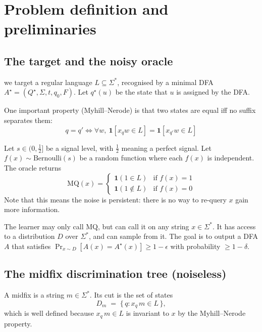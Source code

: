 \section{Problem definition and preliminaries}

\subsection{The target and the noisy oracle}

\begin{definition}[Target]
we target a regular language $L\subseteq\Sigma^*$, recognised by a minimal DFA
$A^\star=(Q^\star,\Sigma,t,q_0,F)$. Let $q^\star(u)$ be the state that $u$
is assigned by the DFA.

One important property (Myhill--Nerode) is that two states are equal iff no suffix separates them:
$$q=q'\iff \forall w,\ \mathbf 1[x_q w\in L]=\mathbf 1[x_{q'} w\in L]$$
\end{definition}

\begin{definition}
Let $s \in (0, \tfrac12]$ be a signal level, with $\frac 12$ meaning a perfect
signal. Let $f(x)\sim\mathrm{Bernoulli}(s)$ be a random function where each $f(x)$ is
independent. The oracle returns
$$\mathrm{MQ}(x)=\left\{\begin{array}{ll}
\mathbf 1(1 \in L) & \text{if } f(x)=1 \\
\mathbf 1(1 \not \in L) & \text{if } f(x)=0
\end{array}\right.$$
Note that this means the noise is persistent: there is no way to re-query $x$ gain more information.
\end{definition}

\begin{definition}
The learner may only call $\mathrm{MQ}$, but can call it on any string $x\in\Sigma^*$. It has
access to a distribution $D$ over $\Sigma^*$, and can sample from it. The goal is to output a DFA $A$ that satisfies
$\Pr_{x\sim D}[A(x)=A^\star(x)]\ge 1 - \epsilon$ with probability $\ge 1 - \delta$.
\end{definition}

\subsection{The midfix discrimination tree (noiseless)}

\begin{definition}\label{def:cut}
A midfix is a string $m\in\Sigma^*$. Its cut is the set of states
\[
  D_m \;=\; \{\,q : x_q\,m\in L\,\},
\]
which is well defined because $x_q\,m\in L$ is invariant to $x$ by the Myhill--Nerode property.
\end{definition}

